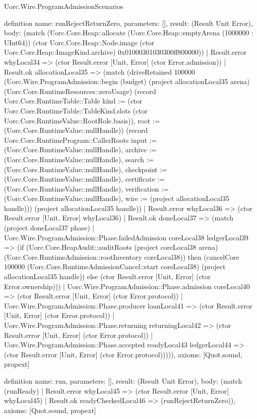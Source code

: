 \begin{lexlean}{Uorc.Wire.ProgramAdmissionScenarios}
\begin{semanticmodule}
definition{
  name: runRejectReturnZero,
  parameters: [],
  result: (Result Unit Error),
  body: (match (Uorc.Core.Heap::allocate (Uorc.Core.Heap::emptyArena (1000000 : UInt64)) (ctor Uorc.Core.Heap::Node.image (ctor Uorc.Core.Heap::ImageKind.archive) 0x01000301030300ff800000))
    | Result.error whyLocal34 => (ctor Result.error [Unit, Error] (ctor Error.admission))
    | Result.ok allocationLocal35 => (match (driveRetained 100000 (Uorc.Wire.ProgramAdmission::begin (budget) (project allocationLocal35 arena) (Uorc.Core.RuntimeResources::zeroUsage) (record Uorc.Core.RuntimeTable::Table {kind := (ctor Uorc.Core.RuntimeTable::TableKind.slots (ctor Uorc.Core.RuntimeValue::RootRole.basis)), root := (Uorc.Core.RuntimeValue::nullHandle)}) (record Uorc.Core.RuntimeProgram::CallerRoots {input := (Uorc.Core.RuntimeValue::nullHandle), archive := (Uorc.Core.RuntimeValue::nullHandle), search := (Uorc.Core.RuntimeValue::nullHandle), checkpoint := (Uorc.Core.RuntimeValue::nullHandle), certificate := (Uorc.Core.RuntimeValue::nullHandle), verification := (Uorc.Core.RuntimeValue::nullHandle), wire := (project allocationLocal35 handle)})) (project allocationLocal35 handle))
      | Result.error whyLocal36 => (ctor Result.error [Unit, Error] whyLocal36)
      | Result.ok doneLocal37 => (match (project doneLocal37 phase)
        | Uorc.Wire.ProgramAdmission::Phase.failedAdmission coreLocal38 ledgerLocal39 => (if (Uorc.Core.HeapAudit::auditRoots (project coreLocal38 arena) (Uorc.Core.RuntimeAdmission::rootInventory coreLocal38)) then (cancelCore 100000 (Uorc.Core.RuntimeAdmissionCancel::start coreLocal38) (project allocationLocal35 handle)) else (ctor Result.error [Unit, Error] (ctor Error.ownership)))
        | Uorc.Wire.ProgramAdmission::Phase.admission coreLocal40 => (ctor Result.error [Unit, Error] (ctor Error.protocol))
        | Uorc.Wire.ProgramAdmission::Phase.producer loanLocal41 => (ctor Result.error [Unit, Error] (ctor Error.protocol))
        | Uorc.Wire.ProgramAdmission::Phase.returning returningLocal42 => (ctor Result.error [Unit, Error] (ctor Error.protocol))
        | Uorc.Wire.ProgramAdmission::Phase.accepted readyLocal43 ledgerLocal44 => (ctor Result.error [Unit, Error] (ctor Error.protocol))))),
  axioms: [Quot.sound, propext]
}

definition{
  name: run,
  parameters: [],
  result: (Result Unit Error),
  body: (match (runReady)
    | Result.error whyLocal45 => (ctor Result.error [Unit, Error] whyLocal45)
    | Result.ok readyCheckedLocal46 => (runRejectReturnZero)),
  axioms: [Quot.sound, propext]
}
\end{semanticmodule}
\end{lexlean}
